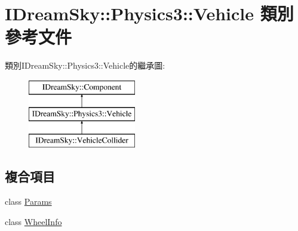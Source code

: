 \hypertarget{class_i_dream_sky_1_1_physics3_1_1_vehicle}{}\section{I\+Dream\+Sky\+:\+:Physics3\+:\+:Vehicle 類別 參考文件}
\label{class_i_dream_sky_1_1_physics3_1_1_vehicle}
類別\+I\+Dream\+Sky\+:\+:Physics3\+:\+:Vehicle的繼承圖\+:\begin{figure}[H]
\begin{center}
\leavevmode
\includegraphics[height=3.000000cm]{class_i_dream_sky_1_1_physics3_1_1_vehicle}
\end{center}
\end{figure}
\subsection*{複合項目}
\begin{DoxyCompactItemize}
\item 
class \hyperlink{class_i_dream_sky_1_1_physics3_1_1_vehicle_1_1_params}{Params}
\item 
class \hyperlink{class_i_dream_sky_1_1_physics3_1_1_vehicle_1_1_wheel_info}{Wheel\+Info}
\end{DoxyCompactItemize}
